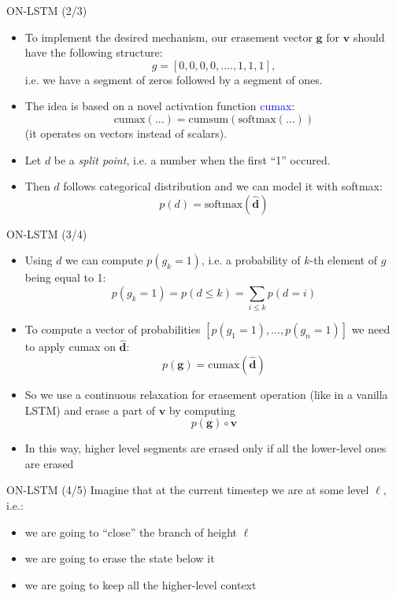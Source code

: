 \documentclass[handout, 10pt]{beamer}
\begin{document}
\begin{frame}{ON-LSTM (2/3)}
\begin{itemize}
\item\pause To implement the desired mechanism, our erasement vector $\bm g$ for $\bm v$ should have the following structure:
\[
g = [0, 0, 0, 0, ...., 1, 1, 1],
\]
i.e. we have a segment of zeros followed by a segment of ones.
\item\pause The idea is based on a novel activation function \textcolor{blue}{cumax}:
\begin{equation*}
    \text{cumax}(...) = \text{cumsum}(\text{softmax}(...))
\end{equation*}
(it operates on vectors instead of scalars).
\item\pause Let $d$ be a \textit{split point}, i.e. a number when the first ``1'' occured.
\item\pause Then $d$ follows categorical distribution and we can model it with softmax:
\[
p(d) = \text{softmax}(\hat{\bm d})
\]
\end{itemize}
\end{frame}

\begin{frame}{ON-LSTM (3/4)}
\begin{itemize}
    \item\pause Using $d$ we can compute $p(g_k = 1)$, i.e. a probability of $k$-th element of $g$ being equal to 1:
\[
p(g_k = 1) = p(d \leq k) = \sum_{i \leq k} p(d = i)
\]
    \item\pause To compute a vector of probabilities $[p(g_1 = 1), ..., p(g_n = 1)]$ we need to apply cumax on $\hat{\bm d}$:
\[
p(\bm g) = \text{cumax}(\hat{\bm d})
\]
    \item\pause So we use a continuous relaxation for erasement operation (like in a vanilla LSTM) and erase a part of $\bm v$ by computing
    \[
        p(\bm g) \circ \bm v
    \]
    \item\pause In this way, higher level segments are erased only if all the lower-level ones are erased
\end{itemize}
\end{frame}


\begin{frame}{ON-LSTM (4/5)}
\pause
Imagine that at the current timestep we are at some level $\ell$, i.e.:
    \begin{itemize}
        \item we are going to ``close'' the branch of height $\ell$
        \item we are going to erase the state below it
        \item we are going to keep all the higher-level context
    \end{itemize}
\end{frame}
\end{document}
